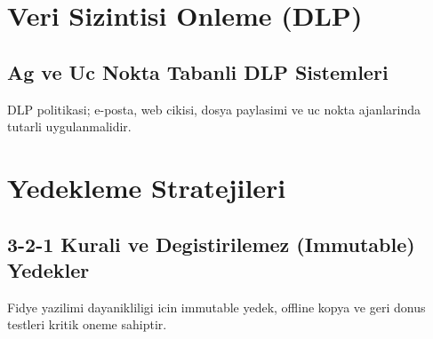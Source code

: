 \section{Veri Sizintisi Onleme (DLP)}
\subsection{Ag ve Uc Nokta Tabanli DLP Sistemleri}
DLP politikasi; e-posta, web cikisi, dosya paylasimi ve uc nokta ajanlarinda tutarli uygulanmalidir.

\section{Yedekleme Stratejileri}
\subsection{3-2-1 Kurali ve Degistirilemez (Immutable) Yedekler}
Fidye yazilimi dayanikliligi icin immutable yedek, offline kopya ve geri donus testleri kritik oneme sahiptir.

